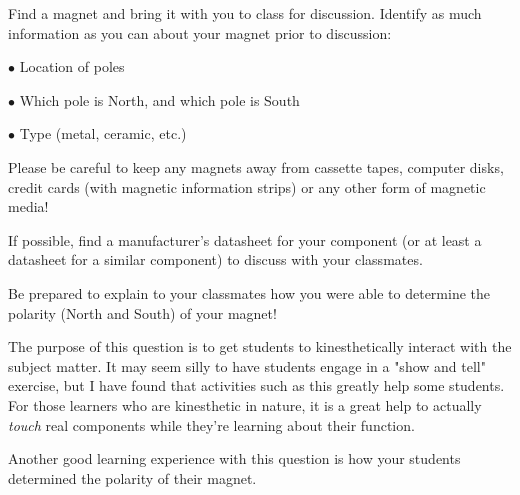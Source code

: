 

Find a magnet and bring it with you to class for discussion.  Identify as much information as you can about your magnet prior to discussion:

\medskip
\item{$\bullet$} Location of poles
\item{$\bullet$} Which pole is North, and which pole is South
\item{$\bullet$} Type (metal, ceramic, etc.)
\medskip

Please be careful to keep any magnets away from cassette tapes, computer disks, credit cards (with magnetic information strips) or any other form of magnetic media!







If possible, find a manufacturer's datasheet for your component (or at least a datasheet for a similar component) to discuss with your classmates.

Be prepared to explain to your classmates how you were able to determine the polarity (North and South) of your magnet!







The purpose of this question is to get students to kinesthetically interact with the subject matter.  It may seem silly to have students engage in a "show and tell" exercise, but I have found that activities such as this greatly help some students.  For those learners who are kinesthetic in nature, it is a great help to actually {\it touch} real components while they're learning about their function.

Another good learning experience with this question is how your students determined the polarity of their magnet.




